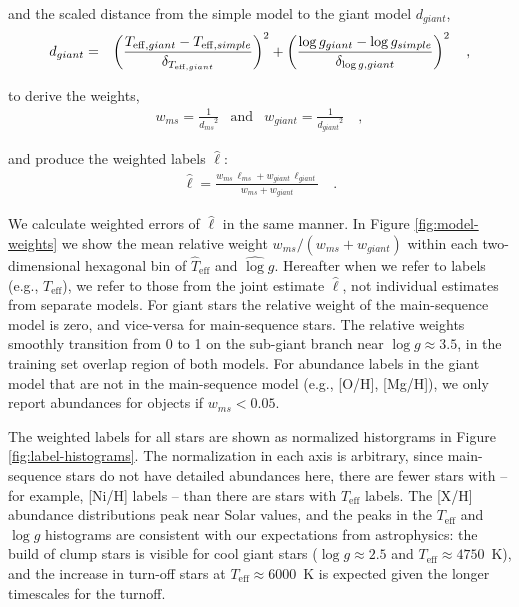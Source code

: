 \documentclass[preprint]{aastex}
\newcommand{\teff}{T_{\mathrm{eff}}}
\newcommand{\logg}{\log g}
\begin{document}
\noindent{}and the scaled distance from the simple model to the giant model $d_{giant}$,
\begin{eqnarray}
	d_{giant} & = & \left(\frac{T_{{\rm eff},giant} - T_{{\rm eff},simple}}{\delta_{T_{{\rm eff},giant}}}\right)^2 + \left(\frac{\log{g}_{giant} - \log{g}_{simple}}{\delta_{\log{g},giant}}\right)^2  \quad ,
\label{eq:d_giant}
\end{eqnarray}

\noindent{}to derive the weights,
\begin{eqnarray}
	w_{ms} = \frac{1}{{d_{ms}}^2} & \text{and} & w_{giant} = \frac{1}{{d_{giant}}^2} \quad ,
\end{eqnarray}

\noindent{}and produce the weighted labels $\hat\ell$:
\begin{eqnarray}
	\hat\ell = \frac{w_{ms}\,\ell_{ms} + w_{giant}\,\ell_{giant}}{w_{ms} + w_{giant}} \quad .
\end{eqnarray}

We calculate weighted errors of $\hat\ell$ in the same manner.  
In Figure \ref{fig:model-weights} we show the mean relative
weight $w_{ms}/(w_{ms} + w_{giant})$ within each two-dimensional hexagonal bin of 
$\hat\teff$ and $\hat\logg$.  Hereafter when we refer to labels (e.g., $\teff$),
we refer to those from the joint estimate $\hat\ell$, not individual estimates 
from separate models.  For giant stars the relative weight of 
the main-sequence model is zero, and vice-versa for main-sequence stars.
The relative weights smoothly transition from 0 to 1 on the sub-giant branch
near $\log{g} \approx 3.5$, in the training set overlap region of both models.
For abundance labels in the giant model that are not in the main-sequence
model (e.g., [O/H], [Mg/H]), we only report abundances for objects if
$w_{ms} < 0.05$.


The weighted labels for all stars are shown as normalized historgrams in
Figure \ref{fig:label-histograms}. The normalization in each axis is arbitrary, 
since main-sequence stars do not have detailed abundances here, there are fewer
stars with -- for example, [Ni/H] labels -- than there are stars with $\teff$
labels. The [X/H] abundance distributions peak near Solar values, and the peaks
in the $\teff$ and $\logg$ histograms are consistent with our expectations from
astrophysics: the build of clump stars is visible for cool giant stars 
($\logg \approx 2.5$ and $\teff \approx 4750$~K), and the increase in turn-off stars
at $\teff \approx 6000$~K is expected given the longer timescales for the turnoff.
\end{document}
